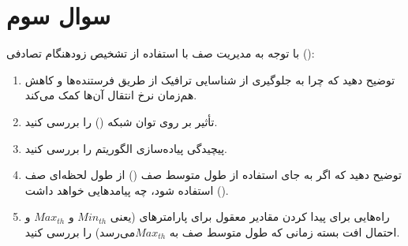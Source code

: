 \section{سوال سوم}

با توجه به مدیریت صف با استفاده از تشخیص زودهنگام تصادفی ():

\begin{enumerate}
	\item 
	توضیح دهید که چرا  به جلوگیری از شناسایی ترافیک  از طریق فرستنده‌ها و کاهش هم‌زمان نرخ انتقال آن‌ها کمک می‌کند.
	
	
	\item 
	تأثیر  بر روی توان شبکه () را بررسی کنید.
	
	
	\item 
	پیچیدگی پیاده‌سازی الگوریتم  را بررسی کنید.
	
	
	\item 
	توضیح دهید که اگر به جای استفاده از طول متوسط صف () از طول لحظه‌ای صف () استفاده شود، چه پیامد‌هایی خواهد داشت.
	
	
	\item 
	راه‌هایی برای پیدا کردن مقادیر معقول برای پارامترهای  (یعنی $Min_{th}$ و $Max_{th}$ و احتمال افت بسته زمانی که طول متوسط صف به $Max_{th}$​ می‌رسد) را بررسی کنید.
\end{enumerate}




